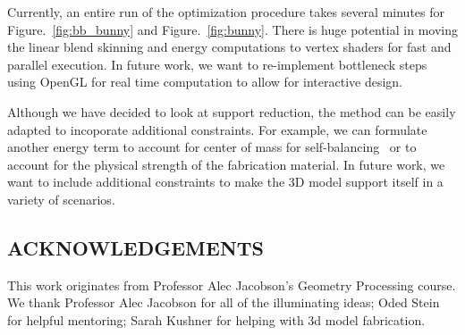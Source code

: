 Currently, an entire run of the optimization procedure takes several minutes for Figure.~\ref{fig:bb_bunny} and Figure.~\ref{fig:bunny}. There is huge potential in moving the linear blend skinning and energy computations to vertex shaders for fast and parallel execution. In future work, we want to re-implement bottleneck steps using OpenGL for real time computation to allow for interactive design.

Although we have decided to look at support reduction, the method can be easily adapted to incoporate additional constraints. For example, we can formulate another energy term to account for center of mass for self-balancing~\cite{make_it_stand_2013} or to account for the physical strength of the fabrication material. In future work, we want to include additional constraints to make the 3D model support itself in a variety of scenarios.


\subsection*{ACKNOWLEDGEMENTS}
This work originates from Professor Alec Jacobson's Geometry Processing course. We thank Professor Alec Jacobson for all of the illuminating ideas; Oded Stein for helpful mentoring; Sarah Kushner for helping with 3d model fabrication.
